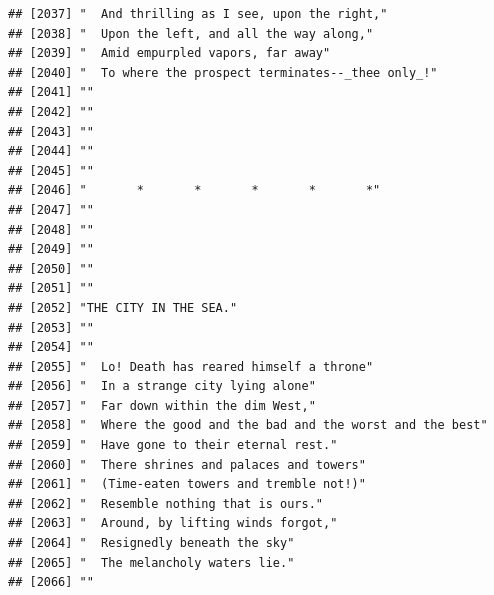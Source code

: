 \documentclass{article}\usepackage[]{graphicx}\usepackage[]{color}
\makeatletter
\newenvironment{kframe}{%
 \def\at@end@of@kframe{}%
 \ifinner\ifhmode%
  \def\at@end@of@kframe{\end{minipage}}%
  \begin{minipage}{\columnwidth}%
 \fi\fi%
 \def\FrameCommand##1{\hskip\@totalleftmargin \hskip-\fboxsep
 \colorbox{shadecolor}{##1}\hskip-\fboxsep
     \hskip-\linewidth \hskip-\@totalleftmargin \hskip\columnwidth}%
 \MakeFramed {\advance\hsize-\width
   \@totalleftmargin\z@ \linewidth\hsize
   \@setminipage}}%
 {\par\unskip\endMakeFramed%
 \at@end@of@kframe}
\newenvironment{knitrout}{}{} %
\makeatother
\begin{document}
\begin{knitrout}
\begin{kframe}
\begin{verbatim}
## [2037] "  And thrilling as I see, upon the right,"                                   
## [2038] "  Upon the left, and all the way along,"                                     
## [2039] "  Amid empurpled vapors, far away"                                           
## [2040] "  To where the prospect terminates--_thee only_!"                            
## [2041] ""                                                                            
## [2042] ""                                                                            
## [2043] ""                                                                            
## [2044] ""                                                                            
## [2045] ""                                                                            
## [2046] "       *       *       *       *       *"                                    
## [2047] ""                                                                            
## [2048] ""                                                                            
## [2049] ""                                                                            
## [2050] ""                                                                            
## [2051] ""                                                                            
## [2052] "THE CITY IN THE SEA."                                                        
## [2053] ""                                                                            
## [2054] ""                                                                            
## [2055] "  Lo! Death has reared himself a throne"                                     
## [2056] "  In a strange city lying alone"                                             
## [2057] "  Far down within the dim West,"                                             
## [2058] "  Where the good and the bad and the worst and the best"                     
## [2059] "  Have gone to their eternal rest."                                          
## [2060] "  There shrines and palaces and towers"                                      
## [2061] "  (Time-eaten towers and tremble not!)"                                      
## [2062] "  Resemble nothing that is ours."                                            
## [2063] "  Around, by lifting winds forgot,"                                          
## [2064] "  Resignedly beneath the sky"                                                
## [2065] "  The melancholy waters lie."                                                
## [2066] ""                                                                            

\end{verbatim}
\end{kframe}
\end{knitrout}
\end{document}
